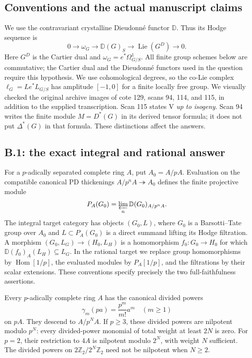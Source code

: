 \subsection{Conventions and the actual manuscript claims}

We use the contravariant crystalline Dieudonn\'e functor $\mathbb D$.
Thus its Hodge sequence is
\[
 0\longrightarrow\omega_G\longrightarrow\mathbb D(G)_S
 \longrightarrow\operatorname{Lie}(G^D)\longrightarrow0.
\]
Here $G^D$ is the Cartier dual and $\omega_G=e^*\Omega^1_{G/S}$.
All finite group schemes below are commutative; the Cartier dual and the
Dieudonn\'e functors used in the question require this hypothesis.
We use cohomological degrees, so the co-Lie complex
$\ell_G=Le^*L_{G/S}$ has amplitude $[-1,0]$ for a finite locally free group.
We visually checked the original archive images of cote 129, scans
94, 114, and 115, in addition to the supplied transcription.
Scan 115 states V \emph{up to isogeny}. Scan 94 writes the finite module
$M=D^*(G)$ in its derived tensor formula; it does not put $\Delta^*(G)$
in that formula. These distinctions affect the answers.

\subsection{B.1: the exact integral and rational answer}

For a $p$-adically separated complete ring $A$, put $A_0=A/pA$.
Evaluation on the compatible canonical PD thickenings
$A/p^nA\twoheadrightarrow A_0$ defines the finite projective module
\[
 P_A(G_0)=\varprojlim_n\mathbb D(G_0)_{A/p^nA}.
\]
The integral target category has objects $(G_0,L)$, where $G_0$ is a
Barsotti--Tate group over $A_0$ and $L\subset P_A(G_0)$ is a direct summand
lifting its Hodge filtration. A morphism $(G_0,L_G)\to(H_0,L_H)$ is a
homomorphism $f_0:G_0\to H_0$ for which
$\mathbb D(f_0)_A(L_H)\subseteq L_G$. In the rational target we replace
group homomorphisms by $\operatorname{Hom}[1/p]$, the evaluated modules by
$P_A[1/p]$, and the filtrations by their scalar extensions.
These conventions specify precisely the two full-faithfulness assertions.

\begin{lemma}
\label{B:PD-bounds}
Every $p$-adically complete ring $A$ has the canonical divided powers
\[
 \gamma_m(pa)=\frac{p^m}{m!}a^m\quad(m\geq1)
\]
on $pA$. They descend to $A/p^NA$. If $p\geq3$, these divided powers
are nilpotent modulo $p^N$: every divided-power monomial of total weight
at least $2N$ is zero. For $p=2$, their restriction to $4A$ is nilpotent
modulo $2^N$, with weight $N$ sufficient. The divided powers on
$2\mathbb Z_2/2^N\mathbb Z_2$ need not be nilpotent when $N\geq2$.
\end{lemma}

